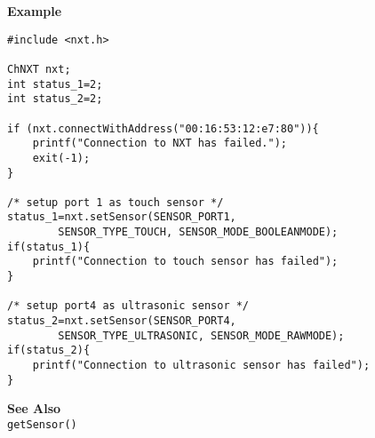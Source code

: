 \noindent
{\bf Example}
\begin{lstlisting}
#include <nxt.h> 

ChNXT nxt;
int status_1=2;
int status_2=2;

if (nxt.connectWithAddress("00:16:53:12:e7:80")){
    printf("Connection to NXT has failed.");
    exit(-1);
}
    
/* setup port 1 as touch sensor */
status_1=nxt.setSensor(SENSOR_PORT1, 
        SENSOR_TYPE_TOUCH, SENSOR_MODE_BOOLEANMODE);
if(status_1){
    printf("Connection to touch sensor has failed");
}

/* setup port4 as ultrasonic sensor */
status_2=nxt.setSensor(SENSOR_PORT4, 
        SENSOR_TYPE_ULTRASONIC, SENSOR_MODE_RAWMODE);
if(status_2){
    printf("Connection to ultrasonic sensor has failed");
}
\end{lstlisting}

\noindent
{\bf See Also}\\
{\tt getSensor()}

